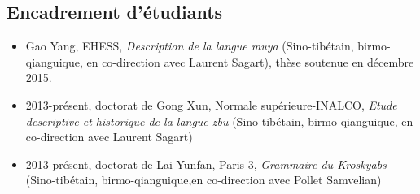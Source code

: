 \documentclass[oldfontcommands,oneside,a4paper,11pt]{article}
\begin{document}
\subsection*{Encadrement d'étudiants}
\begin{itemize}
\item Gao Yang, EHESS, \textit{Description de la langue muya} (Sino-tibétain, birmo-qianguique, en co-direction avec Laurent Sagart), thèse soutenue en décembre 2015.
\item 2013-présent, doctorat de Gong Xun, Normale supérieure-INALCO, \textit{Etude descriptive et historique de la langue zbu} (Sino-tibétain, birmo-qianguique, en co-direction avec Laurent Sagart)
\item 2013-présent, doctorat de Lai Yunfan, Paris 3, \textit{Grammaire du Kroskyabs} (Sino-tibétain, birmo-qianguique,en co-direction avec Pollet Samvelian)
\end{itemize}
\end{document}
